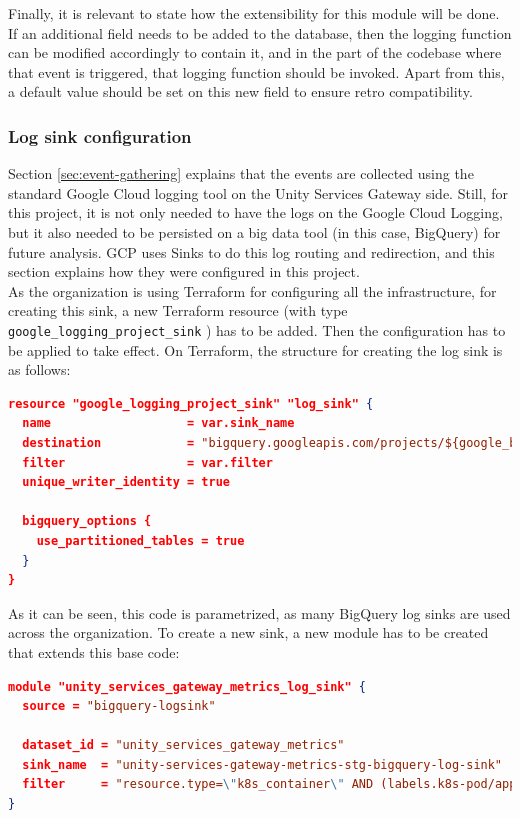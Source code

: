 \documentclass[english, 12pt, a4paper, sci, utf8, a-1b, online]{aaltothesis}
\begin{document}
Finally, it is relevant to state how the extensibility for this module will be done. If an additional field needs to be added to the database, then the logging function can be modified accordingly to contain it, and in the part of the codebase where that event is triggered, that logging function should be invoked. Apart from this, a default value should be set on this new field to ensure retro compatibility.

\subsubsection{Log sink configuration}
\label{sec:log-sink}

Section \ref{sec:event-gathering} explains that the events are collected using the standard Google Cloud logging tool on the Unity Services Gateway side. Still, for this project, it is not only needed to have the logs on the Google Cloud Logging, but it also needed to be persisted on a big data tool (in this case, BigQuery) for future analysis. GCP uses Sinks \cite{GCPSinks} to do this log routing and redirection, and this section explains how they were configured in this project.\\

As the organization is using Terraform for configuring all the infrastructure, for creating this sink, a new Terraform resource (with type \texttt{google\_logging\_project\_sink} \cite{TerraformGoogleSink}) has to be added. Then the configuration has to be applied to take effect. On Terraform, the structure for creating the log sink is as follows:\\

\begin{lstlisting}[language=json,firstnumber=1]
resource "google_logging_project_sink" "log_sink" {
  name                   = var.sink_name
  destination            = "bigquery.googleapis.com/projects/${google_bigquery_dataset.dataset.project}/datasets/${google_bigquery_dataset.dataset.dataset_id}"
  filter                 = var.filter
  unique_writer_identity = true

  bigquery_options {
    use_partitioned_tables = true
  }
}
\end{lstlisting}

As it can be seen, this code is parametrized, as many BigQuery log sinks are used across the organization. To create a new sink, a new module has to be created that extends this base code:\\

\begin{lstlisting}[language=json,firstnumber=1]
module "unity_services_gateway_metrics_log_sink" {
  source = "bigquery-logsink"

  dataset_id = "unity_services_gateway_metrics"
  sink_name  = "unity-services-gateway-metrics-stg-bigquery-log-sink"
  filter     = "resource.type=\"k8s_container\" AND (labels.k8s-pod/app=\"unity-services-gateway-public\" OR labels.k8s-pod/app=\"unity-services-gateway-internal\") AND jsonPayload.key=\"METRICS\""
}
\end{lstlisting}
\end{document}
